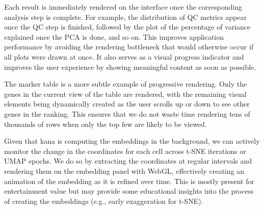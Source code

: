 \documentclass{article}
\begin{document}
Each result is immediately rendered on the interface once the corresponding analysis step is complete.
For example, the distribution of QC metrics appear once the QC step is finished, followed by the plot of the percentage of variance explained once the PCA is done, and so on.
This improves application performance by avoiding the rendering bottleneck that would otherwise occur if all plots were drawn at once. 
It also serves as a visual progress indicator and improves the user experience by showing meaningful content as soon as possible.

The marker table is a more subtle example of progressive rendering.
Only the genes in the current view of the table are rendered, with the remaining visual elements being dynamically created as the user scrolls up or down to see other genes in the ranking.
This ensures that we do not waste time rendering tens of thousands of rows when only the top few are likely to be viewed.

Given that kana is computing the embeddings in the background, we can actively monitor the change in the coordinates for each cell across t-SNE iterations or UMAP epochs.
We do so by extracting the coordinates at regular intervals and rendering them on the embedding panel with WebGL,
effectively creating an animation of the embedding as it is refined over time.
This is mostly present for entertainment value but may provide some educational insights into the process of creating the embeddings (e.g., early exaggeration for t-SNE).

% 
\end{document}
